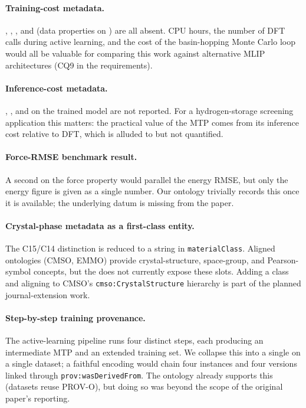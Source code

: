 \paragraph{Training-cost metadata.}
\trainingDurationR{}, \gpuHoursR{}, \trainingHardwareR{}, and
\peakMemoryR{} (data properties on \MLIPRunC{}) are all absent. CPU
hours, the number of DFT calls during active learning, and the cost
of the basin-hopping Monte Carlo loop would all be valuable for
comparing this work against alternative MLIP architectures (CQ9 in
the requirements).

\paragraph{Inference-cost metadata.}
\inferenceTimePerAtomR{}, \inferenceHardwareR{}, and \peakMemoryR{}
on the trained model are not reported. For a hydrogen-storage screening
application this matters: the practical value of the MTP comes from
its inference cost relative to DFT, which is alluded to but not
quantified.

\paragraph{Force-RMSE benchmark result.}
A second \BenchmarkResultC{} on the force property would parallel the
energy RMSE, but only the energy figure is given as a single number.
Our ontology trivially records this once it is available; the
underlying datum is missing from the paper.

\paragraph{Crystal-phase metadata as a first-class entity.}
The C15/C14 distinction is reduced to a string in
\texttt{materialClass}. Aligned ontologies (CMSO, EMMO) provide
crystal-structure, space-group, and Pearson-symbol concepts, but the
\MLIPsOntology{} does not currently expose these slots. Adding a
 class and aligning to CMSO's
\texttt{cmso:CrystalStructure} hierarchy is part of the planned
journal-extension work.
\label{sec:future-phase}

\paragraph{Step-by-step training provenance.}
The active-learning pipeline runs four distinct steps, each producing
an intermediate MTP and an extended training set. We collapse this
into a single \MLIPRunC{} on a single dataset; a faithful encoding
would chain four \MLIPRunC{} instances and four \TrainingDatasetC{}
versions linked through \texttt{prov:wasDerivedFrom}. The ontology
already supports this (datasets reuse PROV-O), but doing so was beyond
the scope of the original paper's reporting.

